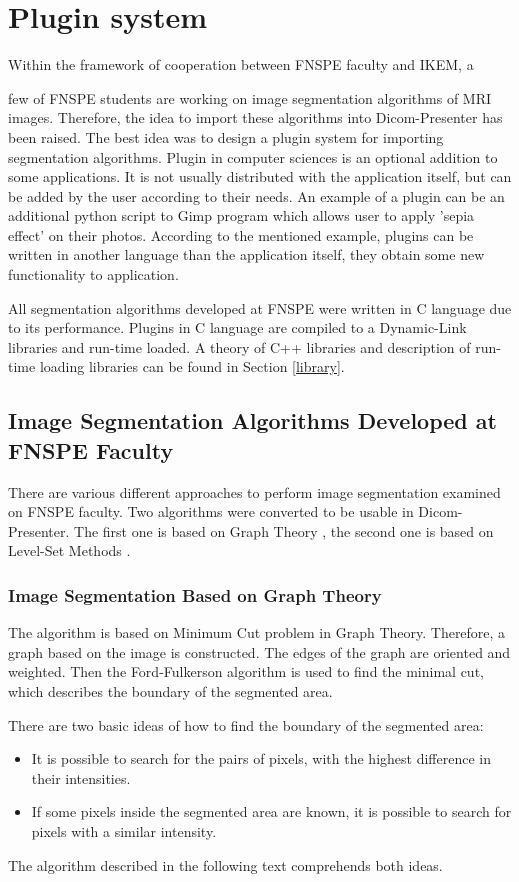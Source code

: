 \chapter{Plugin system}
\vspace{-10mm}

Within the framework of cooperation between FNSPE faculty and IKEM, a

 few of FNSPE students are working on image segmentation algorithms of MRI images. Therefore, the idea to import these algorithms into Dicom-Presenter has been raised. The best idea was to design a plugin system for importing segmentation algorithms.
Plugin in computer sciences is an optional addition to some applications. It is not usually distributed with the application itself, but can be added by the user according to their needs. An example of a plugin can be an additional python script to Gimp program which allows user to apply 'sepia effect' on their photos. According to the mentioned example, plugins can be written in another language than the application itself, they obtain some new functionality to application.


All segmentation algorithms developed at FNSPE were written in C language due to its performance. Plugins in C language are compiled to a Dynamic-Link libraries and run-time loaded. A theory of C++ libraries and description of run-time loading libraries can be found in Section \ref{library}.

\section{Image Segmentation Algorithms Developed at FNSPE Faculty}
There are various different approaches to perform image segmentation examined on FNSPE faculty. Two algorithms were converted to be usable in Dicom-Presenter. The first one is based on Graph Theory \cite{loucky}, the second one is based on Level-Set Methods \cite{macaradek}.

\subsection{Image Segmentation Based on Graph Theory}
The algorithm is based on Minimum Cut problem in Graph Theory. Therefore, a graph based on the image is constructed. The edges of the graph are oriented and weighted. Then the Ford-Fulkerson algorithm is used to find the minimal cut, which describes the boundary of the segmented area.

There are two basic ideas of how to find the boundary of the segmented area\cite{loucky}:
\begin{itemize}
\item It is possible to search for the pairs of pixels, with the highest difference in their intensities.
\item If some pixels inside the segmented area are known, it is possible to search for pixels with a similar intensity.
\end{itemize}
The algorithm described in the following text comprehends both ideas.

